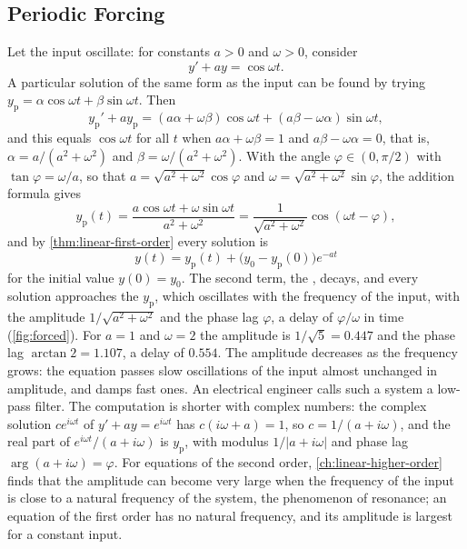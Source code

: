 \subsection{Periodic Forcing}

Let the input oscillate: for constants $a>0$ and $\omega>0$, consider
\[
y'+ay=\cos\omega t .
\]
A particular solution of the same form as the input can be found by trying $y_{\mathrm p}=\alpha\cos\omega t+\beta\sin\omega t$. Then
\[
y_{\mathrm p}'+ay_{\mathrm p}=(a\alpha+\omega\beta)\cos\omega t+(a\beta-\omega\alpha)\sin\omega t ,
\]
and this equals $\cos\omega t$ for all $t$ when $a\alpha+\omega\beta=1$ and $a\beta-\omega\alpha=0$, that is, $\alpha=a/(a^2+\omega^2)$ and $\beta=\omega/(a^2+\omega^2)$. With the angle $\varphi\in(0,\pi/2)$ with $\tan\varphi=\omega/a$, so that $a=\sqrt{a^2+\omega^2}\cos\varphi$ and $\omega=\sqrt{a^2+\omega^2}\sin\varphi$, the addition formula gives
\[
y_{\mathrm p}(t)=\frac{a\cos\omega t+\omega\sin\omega t}{a^2+\omega^2}=\frac1{\sqrt{a^2+\omega^2}}\cos(\omega t-\varphi),
\]
and by \cref{thm:linear-first-order} every solution is
\[
y(t)=y_{\mathrm p}(t)+\bigl(y_0-y_{\mathrm p}(0)\bigr)e^{-at}
\]
for the initial value $y(0)=y_0$. The second term, the , decays, and every solution approaches the  $y_{\mathrm p}$, which oscillates with the frequency of the input, with the amplitude $1/\sqrt{a^2+\omega^2}$ and the phase lag $\varphi$, a delay of $\varphi/\omega$ in time (\cref{fig:forced}). For $a=1$ and $\omega=2$ the amplitude is $1/\sqrt5=0.447$ and the phase lag $\arctan2=1.107$, a delay of $0.554$. The amplitude decreases as the frequency grows: the equation passes slow oscillations of the input almost unchanged in amplitude, and damps fast ones. An electrical engineer calls such a system a low-pass filter. The computation is shorter with complex numbers: the complex solution $ce^{i\omega t}$ of $y'+ay=e^{i\omega t}$ has $c(i\omega+a)=1$, so $c=1/(a+i\omega)$, and the real part of $e^{i\omega t}/(a+i\omega)$ is $y_{\mathrm p}$, with modulus $1/|a+i\omega|$ and phase lag $\arg(a+i\omega)=\varphi$. For equations of the second order, \cref{ch:linear-higher-order} finds that the amplitude can become very large when the frequency of the input is close to a natural frequency of the system, the phenomenon of resonance; an equation of the first order has no natural frequency, and its amplitude is largest for a constant input.

